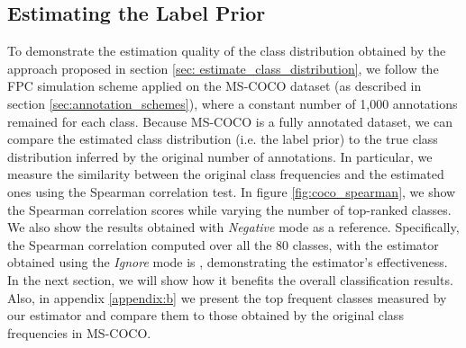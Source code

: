 \subsection{Estimating the Label Prior}
\label{sec:results_estimate_class_prior}
To demonstrate the estimation quality of the class distribution obtained by the approach proposed in section \ref{sec: estimate_class_distribution}, we follow the FPC simulation scheme applied on the MS-COCO dataset (as described in section \ref{sec:annotation_schemes}), where a constant number of 1,000 annotations remained for each class. Because MS-COCO is a fully annotated dataset, we can compare the estimated class distribution (i.e. the label prior) to the true class distribution inferred by the original number of annotations. In particular, we measure the similarity between the original class frequencies and the estimated ones using the Spearman correlation test. In figure \ref{fig:coco_spearman}, we show the Spearman correlation scores while varying the number of top-ranked classes. We also show the results obtained with \textit{Negative} mode as a reference. Specifically, the Spearman correlation computed over all the 80 classes, with the estimator obtained using the \textit{Ignore} mode is , demonstrating the estimator's effectiveness. In the next section, we will show how it benefits the overall classification results. Also, in appendix \ref{appendix:b} we present the top frequent classes measured by our estimator and compare them to those obtained by the original class frequencies in MS-COCO.







































